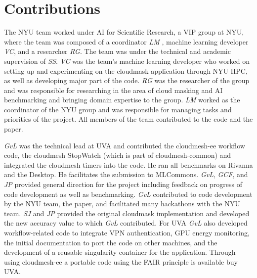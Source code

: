 \documentclass[sigplan,screen]{acmart}
\begin{document}


\section*{Contributions}

The NYU team worked under AI for Scientific Research, a VIP group at NYU, where the team was composed of a coordinator {\em LM} , machine learning developer {\em VC}, and a researcher {\em RG}. The team was under the technical and academic supervision of {\em SS}. {\em VC} was the team’s machine learning developer who worked on setting up and experimenting on the cloudmask application through NYU HPC, as well as developing major part of the code. {\em RG} was the researcher of the group and was responsible for researching in the area of cloud masking and AI benchmarking and bringing domain expertise to the group. {\em LM}  worked as the coordinator of the NYU group and was responsible for managing tasks and priorities of the project. All members of the team contributed to the code and the paper. 

{\em GvL} was the technical lead  at UVA and contributed the cloudmesh-ee workflow code, the cloudmesh StopWatch (which is part of cloudmesh-common) and integrated the cloudmesh timers into the code. He ran all benchmarks on Rivanna and the Desktop.  He  facilitates the submission to MLCommons. {\em GvL}, {\em GCF}, and {\em JP} provided general direction for the project including  feedback on progress of code development as well as benchmarking. {\em GvL} contributed to code development by the NYU team, the paper, and facilitated many hackathons with the NYU team. {\em SJ} and {\em JP} provided the  original cloudmask implementation and developed the new accuracy value to which {\em GvL} contributed. For UVA {\em GvL} also developed workflow-related code to integrate VPN authentication, GPU energy monitoring, the initial documentation to port the code on other machines, and the development of a reusable singularity container for the application. Through using cloudmesh-ee a portable code using the FAIR principle is available buy UVA.
\end{document}
